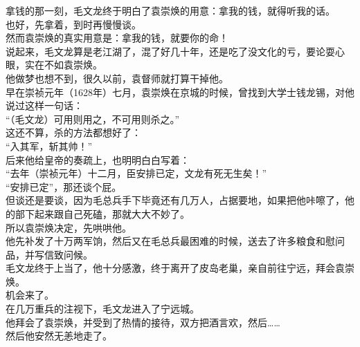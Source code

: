\begin{multicols}{\theparacolNo}
拿钱的那一刻，毛文龙终于明白了袁崇焕的用意：拿我的钱，就得听我的话。\\

也好，先拿着，到时再慢慢谈。\\

然而袁崇焕的真实用意是：拿我的钱，就要你的命！\\

说起来，毛文龙算是老江湖了，混了好几十年，还是吃了没文化的亏，要论耍心眼，实在不如袁崇焕。\\

他做梦也想不到，很久以前，袁督师就打算干掉他。\\

早在崇祯元年（1628年）七月，袁崇焕在京城的时候，曾找到大学士钱龙锡，对他说过这样一句话：\\

“（毛文龙）可用则用之，不可用则杀之。”\\

这还不算，杀的方法都想好了：\\

“入其军，斩其帅！”\\

后来他给皇帝的奏疏上，也明明白白写着：\\

“去年（崇祯元年）十二月，臣安排已定，文龙有死无生矣！”\\

“安排已定”，那还谈个屁。\\

但谈还是要谈，因为毛总兵手下毕竟还有几万人，占据要地，如果把他咔嚓了，他的部下起来跟自己死磕，那就大大不妙了。\\

所以袁崇焕决定，先哄哄他。\\

他先补发了十万两军饷，然后又在毛总兵最困难的时候，送去了许多粮食和慰问品，并写信致问候。\\

毛文龙终于上当了，他十分感激，终于离开了皮岛老巢，亲自前往宁远，拜会袁崇焕。\\

机会来了。\\

在几万重兵的注视下，毛文龙进入了宁远城。\\

他拜会了袁崇焕，并受到了热情的接待，双方把酒言欢，然后……\\

然后他安然无恙地走了。\\


\end{multicols}
